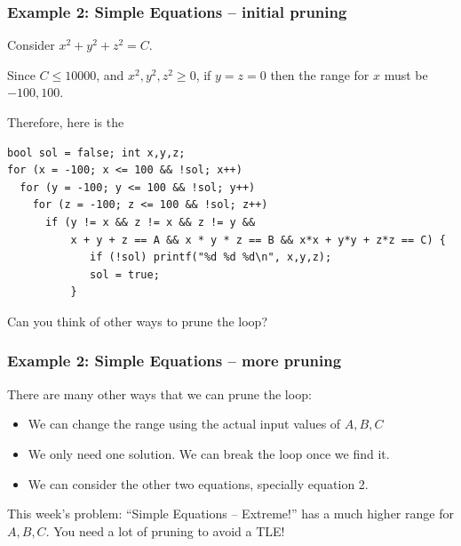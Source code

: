 \documentclass{beamer}
\begin{document}

\begin{frame}[fragile]
  \frametitle{Example 2: Simple Equations -- initial pruning}

  \begin{block}{}
    Consider $x^2 + y^2 + z^2 = C$.

    Since $C \leq 10000$, and $x^2,y^2,z^2 \geq 0$, if $y =
    z = 0$ then the range for $x$ must be $-100, 100$.

    \bigskip

    Therefore, here is the 
  \end{block}

{\smaller
\begin{verbatim}
bool sol = false; int x,y,z;
for (x = -100; x <= 100 && !sol; x++)
  for (y = -100; y <= 100 && !sol; y++)
    for (z = -100; z <= 100 && !sol; z++)
      if (y != x && z != x && z != y &&
          x + y + z == A && x * y * z == B && x*x + y*y + z*z == C) {
             if (!sol) printf("%d %d %d\n", x,y,z);
             sol = true;
          }
\end{verbatim}

\begin{block}{}
  Can you think of other ways to prune the loop?


\end{block}
}
\end{frame}

\begin{frame}
  \frametitle{Example 2: Simple Equations -- more pruning}
  There are many other ways that we can prune the loop:

  \medskip

  \begin{itemize}
  \item We can change the range using the actual input values of $A,B,C$
  \item We only need one solution. We can break the loop once we find it.
  \item We can consider the other two equations, specially equation 2.
  \end{itemize}

  \vfill

  \begin{alertblock}{}
    This week's problem: ``Simple Equations -- Extreme!'' has a much
    higher range for $A,B,C$. You need a lot of pruning to avoid a TLE!
  \end{alertblock}
\end{frame}
\end{document}
